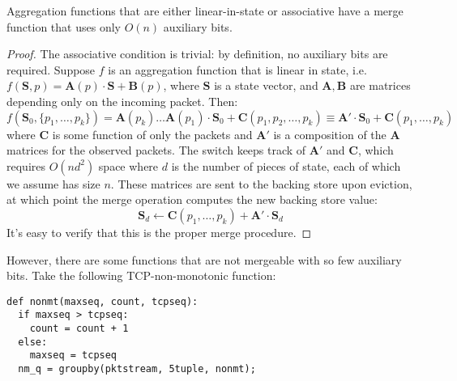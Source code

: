 \begin{theorem}
 Aggregation functions that are either linear-in-state or associative have a merge function that uses only $O(n)$ auxiliary bits.
\end{theorem}
\begin{proof}
The associative condition is trivial: by definition, no auxiliary bits are required. 
Suppose $f$ is an aggregation function that is linear in state, i.e. $f(\mathbf{S}, p) = \mathbf{A}(p) \cdot \mathbf{S} + \mathbf{B}(p)$, where $\mathbf{S}$ is a state vector, and $\mathbf{A,B}$ are matrices depending only on the incoming packet. Then:
\[ f(\mathbf{S}_0, \{p_1, \ldots, p_k\}) = \mathbf{A}(p_k)\ldots \mathbf{A}(p_1) \cdot \mathbf{S}_0 + \mathbf{C}(p_1, p_2, \ldots, p_k) \equiv \mathbf{A'} \cdot \mathbf{S}_0 + \mathbf{C}(p_1, \ldots, p_k)\]
where $\mathbf{C}$ is some function of only the packets and $\mathbf{A'}$ is a composition of the $\mathbf{A}$ matrices for the observed packets. The switch keeps track of $\mathbf{A'}$ and $\mathbf{C}$, which requires $O(nd^2)$ space where $d$ is the number of pieces of state, each of which we assume has size $n$. These matrices are sent to the backing store upon eviction, at which point the merge operation computes the new backing store value:
\[ \mathbf{S}_d \leftarrow \mathbf{C}(p_1, \ldots, p_k) + \mathbf{A'} \cdot \mathbf{S}_d \]
It's easy to verify that this is the proper merge procedure.
\end{proof}

However, there are some functions that are not mergeable with so few auxiliary bits. Take the following TCP-non-monotonic function:
\begin{verbatim}
def nonmt(maxseq, count, tcpseq):
  if maxseq > tcpseq:
    count = count + 1
  else:
    maxseq = tcpseq
  nm_q = groupby(pktstream, 5tuple, nonmt);
\end{verbatim}

